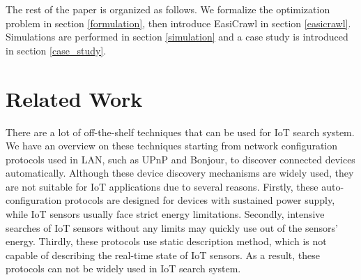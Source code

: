 \documentclass[conference]{IEEEtran}
\begin{document}
The rest of the paper is organized as follows. 
We formalize the optimization problem in section \ref{formulation}, then introduce EasiCrawl in section \ref{easicrawl}. 
Simulations are performed in section \ref{simulation} and a case study is introduced in section \ref{case_study}. 

\section{Related Work}\label{related_work}

There are a lot of off-the-shelf techniques that can be used for IoT search system.
We have an overview on these techniques starting from network configuration protocols used in LAN, such as UPnP\cite{UPnP} and Bonjour\cite{Bonjour}, to discover connected devices automatically.
Although these device discovery mechanisms are widely used, they are not suitable for IoT applications due to several reasons.
Firstly, these auto-configuration protocols are designed for devices with sustained power supply, while IoT sensors usually face strict energy limitations.
Secondly, intensive searches of IoT sensors without any limits may quickly use out of the sensors’ energy.
Thirdly, these protocols use static description method, which is not capable of describing the real-time state of IoT sensors.
As a result, these protocols can not be widely used in IoT search system.
\end{document}
